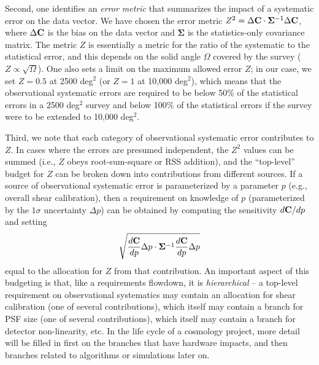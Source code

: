 \documentclass[usenatbib]{mnras}
\begin{document}
Second, one identifies an {\em error metric} that summarizes the impact of a systematic error on the data vector. We have chosen the error metric $Z^2 = \Delta{\bf C}\cdot{\boldsymbol\Sigma}^{-1}\Delta{\bf C}$, where $\Delta{\bf C}$ is the bias on the data vector and ${\boldsymbol\Sigma}$ is the statistics-only covariance matrix. The metric $Z$ is essentially a metric for the ratio of the systematic to the statistical error, and this depends on the solid angle $\Omega$ covered by the survey ($Z\propto \sqrt\Omega$). One also sets a limit on the maximum allowed error $Z$; in our case, we set $Z=0.5$ at 2500 deg$^2$ (or $Z=1$ at 10,000 deg$^2$), which means that the observational systematic errors are required to be below 50\% of the statistical errors in a 2500 deg$^2$ survey and below 100\% of the statistical errors if the survey were to be extended to 10,000 deg$^2$. 

Third, we note that each category of observational systematic error contributes to $Z$. In cases where the errors are presumed independent, the $Z^2$ values can be summed (i.e., $Z$ obeys root-sum-square or RSS addition), and the ``top-level'' budget for $Z$ can be broken down into contributions from different sources. If a source of observational systematic error is parameterized by a parameter $p$ (e.g., overall shear calibration), then a requirement on knowledge of $p$ (parameterized by the $1\sigma$ uncertainty $\Delta p$) can be obtained by computing the sensitivity $d{\bf C}/dp$ and setting
\begin{equation}
\sqrt{\frac{d{\bf C}}{dp} \Delta p \cdot {\boldsymbol\Sigma}^{-1} \frac{d{\bf C}}{dp} \Delta p}
\end{equation}
equal to the allocation for $Z$ from that contribution. An important aspect of this budgeting is that, like a requirements flowdown, it is {\em hierarchical} -- a top-level requirement on observational systematics may contain an allocation for shear calibration (one of several contributions), which itself may contain a branch for PSF size (one of several contributions), which itself may contain a branch for detector non-linearity, etc. In the life cycle of a cosmology project, more detail will be filled in first on the branches that have hardware impacts, and then branches related to algorithms or simulations later on.
\end{document}
